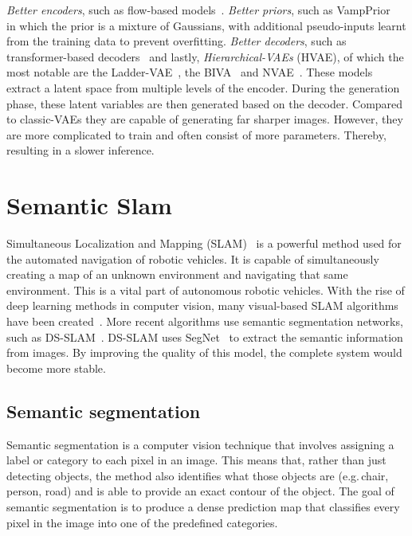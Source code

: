 \emph{Better encoders}, such as flow-based models~\cite{Berg2018SylvesterNF,tomczak2017improving,rezende2015variational}. \emph{Better priors}, such as VampPrior~\cite{tomczak2018vae} in which the prior is a mixture of Gaussians, with additional pseudo-inputs learnt from the training data to prevent overfitting. \emph{Better decoders}, such as transformer-based decoders~\cite{Henderson2022AVA,9054554} and lastly, \emph{Hierarchical-VAEs} (HVAE), of which the most notable are the Ladder-VAE~\cite{NIPS2016_6ae07dcb}, the BIVA~\cite{maaloe2019biva} and NVAE~\cite{vahdat2020nvae}. These models extract a latent space from multiple levels of the encoder. During the generation phase, these latent variables are then generated based on the decoder. Compared to classic-VAEs they are capable of generating far sharper images. However, they are more complicated to train and often consist of more parameters. Thereby, resulting in a slower inference.


\section{Semantic Slam}
Simultaneous Localization and Mapping (SLAM)~\cite{chatila1985position} is a powerful method used for the automated navigation of robotic vehicles. It is capable of simultaneously creating a map of an unknown environment and navigating that same environment. This is a vital part of autonomous robotic vehicles. With the rise of deep learning methods in computer vision, many visual-based SLAM algorithms have been created~\cite{taketomi2017visual}. More recent algorithms use semantic segmentation networks, such as DS-SLAM~\cite{yu2018ds}. DS-SLAM uses SegNet~\cite{badri2017segnet} to extract the semantic information from images. By improving the quality of this model, the complete system would become more stable.

\subsection{Semantic segmentation}
Semantic segmentation is a computer vision technique that involves assigning a label or category to each pixel in an image. This means that, rather than just detecting objects, the method also identifies what those objects are (e.g.\,chair, person, road) and is able to provide an exact contour of the object. The goal of semantic segmentation is to produce a dense prediction map that classifies every pixel in the image into one of the predefined categories.

